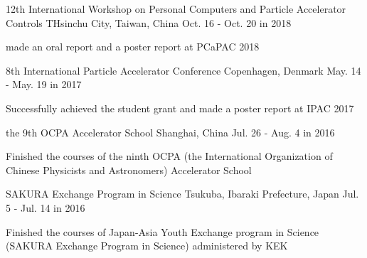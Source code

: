 

\begin{cventries}

  \cventry
    {} %
    {12th International Workshop on Personal Computers and Particle Accelerator Controls} %
    {THsinchu City, Taiwan, China} %
    {Oct. 16 - Oct. 20 in 2018} %
    {
        \begin{cvitems} %
            \item {made an oral report and a poster report at PCaPAC 2018}
        \end{cvitems}    
    }

  \cventry
    {} %
    {8th International Particle Accelerator Conference} %
    {Copenhagen, Denmark} %
    {May. 14 - May. 19 in 2017} %
    {
        \begin{cvitems} %
            \item {Successfully achieved the student grant and made a poster report at IPAC 2017}
        \end{cvitems}    
    }

  \cventry
    {} %
    {the 9th OCPA Accelerator School} %
    {Shanghai, China} %
    {Jul. 26 - Aug. 4 in 2016} %
    {
        \begin{cvitems} %
            \item {Finished the courses of the ninth OCPA (the International Organization of Chinese Physicists and Astronomers) Accelerator School }
        \end{cvitems}
    }

  \cventry
    {} %
    {SAKURA Exchange Program in Science} %
    {Tsukuba, Ibaraki Prefecture, Japan} %
    {Jul. 5 - Jul. 14 in 2016} %
    {
        \begin{cvitems} %
            \item {Finished the courses of Japan-Asia Youth Exchange program in Science (SAKURA Exchange Program in Science) administered by KEK}
        \end{cvitems}
    }

\end{cventries}

